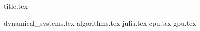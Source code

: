 \documentclass[12pt,a4paper,twoside]{article}
\numberwithin{figure}{section}
\numberwithin{equation}{section}
\theoremstyle{definition}
\theoremstyle{remark}
\theoremstyle{remark}
\begin{document}
{title.tex}

\newpage
\tableofcontents
\newpage

\pagestyle{headings}

{dynamical_systems.tex}
{algorithms.tex}
{julia.tex}
{cpu.tex}
{gpu.tex}

\printbibliography
\end{document}
